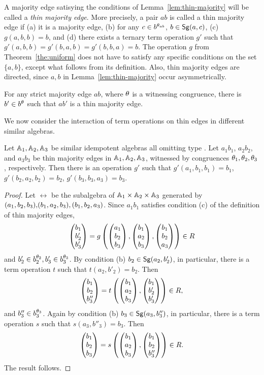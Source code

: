 \documentclass[11pt]{article}
\begin{document}
A majority edge satisying the conditions of Lemma~\ref{lem:thin-majority} will be
called a \emph{thin majority edge}. More precisely, a pair $ab$ is called a thin 
majority edge if (a) it is a majority edge, (b) for any $c\in b^{\theta_{ab}}$, 
$b\in{\sf Sg}(a,c)$, (c) $g(a,b,b)=b$, and (d) there exists a ternary term operation 
$g'$ such that $g'(a,b,b)=g'(b,a,b)=g'(b,b,a)=b$.  The operation $g$ from 
Theorem~\ref{the:uniform} does not have to satisfy any specific conditions on 
the set $\{a,b\}$, except what follows from its definition. Also, thin majority edges
are directed, since $a,b$ in Lemma~\ref{lem:thin-majority} occur asymmetrically.

\begin{corollary}\label{cor:thin-majority}
For any strict majority edge $ab$, where $\theta$ is a witnessing congruence, there is 
$b'\in b^\theta$ such that $ab'$ is a thin majority edge.
\end{corollary}

We now consider the interaction of term operations on thin edges in different 
similar algebras.

\begin{lemma}\label{lem:thin-majority-triple}
Let ${\mathbb A}_1,{\mathbb A}_2,{\mathbb A}_3$ be similar idempotent algebras all omitting type \one.
Let $a_1b_1$, $a_2b_2$, and $a_3b_3$ be thin majority edges in ${\mathbb A}_1,{\mathbb A}_2,{\mathbb A}_3$, 
witnessed by congruences $\theta_1,\theta_2,\theta_3$, respectively. Then there is an operation 
$g'$ such that $g'(a_1,b_1,b_1)=b_1$, $g'(b_2,a_2,b_2)=b_2$, $g'(b_3,b_3,a_3)=b_3$.
\end{lemma}

\begin{proof}
Let $\rel$ be the subalgebra of ${\mathbb A}_1\times{\mathbb A}_2\times{\mathbb A}_3$ generated by 
$(a_1,b_2,b_3),\lb(b_1,a_2,b_3),(b_1,b_2,a_3)$. Since $a_1b_1$ satisfies condition
(c) of the definition of thin majority edges,
$$
\cll{b_1}{b'_2}{b'_3}=g\left(\cll{a_1}{b_2}{b_3},\cll{b_1}{a_2}{b_3},
\cll{b_1}{b_2}{a_3}\right)\in\rel
$$
and $b'_2\in b_2^{\theta_2}, b'_3\in b_3^{\theta_3}$. By condition (b)
$b_2\in{\sf Sg}(a_2,b'_2)$, in particular, there is a term operation $t$ such that 
$t(a_2,b'_2)=b_2$. Then 
$$
\cll{b_1}{b_2}{b''_3}=t\left(\cll{b_1}{a_2}{b_3},\cll{b_1}{b'_2}{b'_3}\right)\in\rel,
$$
and $b''_3\in b_3^{\theta_3}$. Again by condition (b) $b_3\in{\sf Sg}(a_3,b''_3)$, in particular, 
there is a term operation $s$ such that $s(a_3,b''_3)=b_3$. Then 
$$
\cll{b_1}{b_2}{b_3}=s\left(\cll{b_1}{a_2}{b_3},\cll{b_1}{b_2}{b''_3}\right)\in\rel.
$$
The result follows.
\end{proof}
\end{document}

